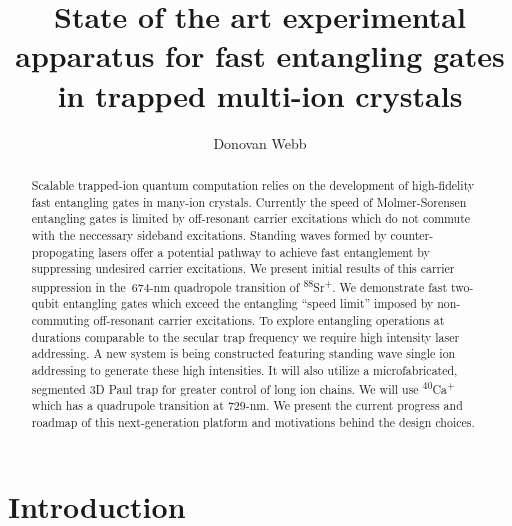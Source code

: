 \documentclass[12pt]{iopart}
\begin{document}
\title[]{State of the art experimental apparatus for fast entangling gates in trapped multi-ion crystals}

\author{Donovan Webb}

\address{Department of Physics,
University of Oxford}

\begin{abstract}

    Scalable trapped-ion quantum computation relies on the development
    of high-fidelity fast entangling gates in many-ion crystals.
    Currently the speed of Molmer-Sorensen entangling gates is limited
    by off-resonant carrier excitations which do not commute with the
    neccessary sideband excitations.
    Standing waves formed by counter-propogating lasers offer a
    potential pathway to achieve fast entanglement by suppressing
    undesired carrier excitations.
    We present initial results of this carrier suppression in
    the~$674$-nm quadropole transition of
    \textsuperscript{88}Sr\textsuperscript{+}. We demonstrate fast
    two-qubit entangling gates which exceed the entangling ``speed
    limit'' imposed by non-commuting off-resonant carrier excitations.
    To explore entangling operations at durations comparable to the
    secular trap frequency we require high intensity laser
    addressing. A new system is being constructed featuring standing
    wave single ion addressing to generate these high intensities.  It
    will also utilize a microfabricated, segmented 3D Paul trap for
    greater control of long ion chains. We will use
    \textsuperscript{40}Ca\textsuperscript{+} which has a quadrupole
    transition at $729$-nm. We present the current progress and
    roadmap of this next-generation platform and motivations behind
    the design choices.

\end{abstract}

\section{Introduction}

\end{document}
